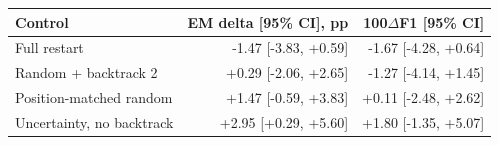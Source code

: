 \begin{tabular}{@{}lrr@{}}
\toprule
Control & EM delta [95\% CI], pp & 100$\Delta$F1 [95\% CI] \\
\midrule
Full restart & -1.47 [-3.83, +0.59] & -1.67 [-4.28, +0.64] \\
Random + backtrack 2 & +0.29 [-2.06, +2.65] & -1.27 [-4.14, +1.45] \\
Position-matched random & +1.47 [-0.59, +3.83] & +0.11 [-2.48, +2.62] \\
Uncertainty, no backtrack & +2.95 [+0.29, +5.60] & +1.80 [-1.35, +5.07] \\
\bottomrule
\end{tabular}
